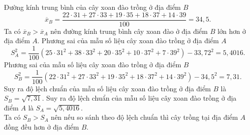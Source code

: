 \begin{ex}
{\begin{itemchoice}
			Đường kính trung bình của cây xoan đào trồng ở địa điểm $B$ 
			$$ \overline{x}_B=\dfrac{22\cdot31+27\cdot33+19\cdot35+18\cdot37+14\cdot39}{100}=34{,}5.$$
			Ta có $\overline{x}_B>\overline{x}_A$ nên đường kính trung bình cây xoan đào ở địa điểm $ B $ lớn hơn ở địa điểm $ A $.
			\itemch  Phương sai của mẫu số liệu cây xoan đào trồng ở địa điểm $ A $
			$$ S_A^2=\dfrac{1}{100}\left(25\cdot31^2+38\cdot33^2+20\cdot35^2+10\cdot37^2+7\cdot39^2 \right)- 33{,}72^2=5{,}4016. $$
			\itemch  Phương sai của mẫu số liệu cây xoan đào trồng ở địa điểm $ B $
			$$ S_B^2=\dfrac{1}{100}\left(22\cdot31^2+27\cdot33^2+19\cdot35^2+18\cdot37^2+14\cdot39^2 \right)- 34{,}5^2=7{,}31. $$
			Suy ra độ lệch chuẩn của mẫu số liệu cây xoan đào trồng ở địa điểm $ B $ là $ S_B=\sqrt{7{,}31} $.
			\itemch 
			Suy ra độ lệch chuẩn của mẫu số liệu cây xoan đào trồng ở địa điểm $ A $ là $ S_A=\sqrt{5{,}4016} $.\\
			Ta có $ S_B > S_A $ nên nếu so sánh theo độ lệch chuẩn thì cây trồng tại địa điểm $ A $ đồng đều hơn ở địa điểm $ B $.
		\end{itemchoice}
	}
\end{ex}

